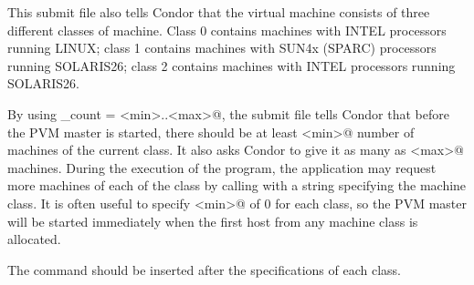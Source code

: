This submit file also tells Condor that the virtual machine
consists of three different classes of machine.  Class
0 contains machines with INTEL processors running LINUX; class
1 contains machines with SUN4x (SPARC) processors running SOLARIS26;
class 2 contains machines with INTEL processors running SOLARIS26.

By using \verb@machine_count = <min>..<max>@, the submit file tells
Condor that before the PVM master is started, there should be at least
\verb@<min>@ 
number of machines of the current class.  It also asks Condor to give
it as many as \verb@<max>@ machines.  During the execution of the program,
the application may request more machines of each of the class by calling
 with a string specifying the machine
class.
It is often useful to specify \verb@<min>@ of 0 for each
class, so the PVM master will be started immediately when the first
host from any machine class is allocated.

The  command should be inserted after the specifications of
each class.

